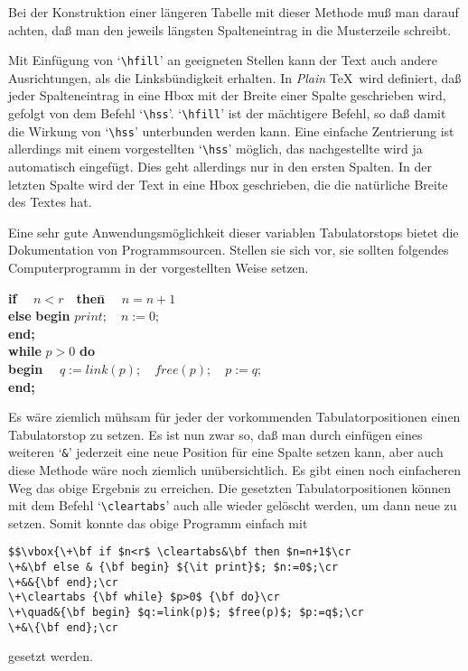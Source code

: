 Bei der Konstruktion einer l\"angeren Tabelle mit dieser Methode mu\ss{}
man darauf achten, da\ss{} man den jeweils l\"angsten Spalteneintrag in die
Musterzeile schreibt.

Mit 
Einf\"ugung von 
`\verb|\hfill|' an geeigneten Stellen kann der Text
auch andere Ausrichtungen, als die 
Linksb\"undigkeit erhalten. In {\em Plain}
\TeX\ wird definiert, da\ss{} jeder Spalteneintrag in eine 
Hbox mit der
Breite einer Spalte geschrieben wird, gefolgt von dem Befehl
`\verb|\hss|'. 
`\verb|\hfill|' ist der m\"achtigere Befehl, so da\ss{} damit
die Wirkung von `\verb|\hss|' unterbunden werden kann. Eine einfache
Zentrierung ist allerdings mit einem vorgestellten `\verb|\hss|'
m\"oglich, das nachgestellte wird ja automatisch eingef\"ugt. Dies geht
allerdings nur in den ersten Spalten. In der letzten Spalte wird der
Text in eine Hbox geschrieben, die die nat\"urliche Breite des Textes
hat.

Eine sehr gute Anwendungsm\"oglichkeit dieser variablen Tabulatorstops
bietet die Dokumentation von Programmsourcen. Stellen sie sich vor,
sie sollten folgendes Computerprogramm in der vorgestellten Weise
setzen.

\medskip\begin{tabbing}
\qquad\= {\bf if}\= $\quad n<r\quad$\= {\bf then}\= $\quad n=n+1$\\
\> \> \> {\bf else} \> {\bf begin} $print;\quad n:=0;$\\
\> \> \> \> {\bf end;}\\
\> {\bf while} $p>0$ {\bf do} \> \> \> \\
\> \> {\bf begin} $\quad q:=link(p);\quad free(p);\quad p:=q;$ \> \> \\
\> \> {\bf end;} \> \> \\
\end{tabbing}\medskip

Es w\"are ziemlich m\"uhsam f\"ur jeder der vorkommenden Tabulatorpositionen
einen Tabulatorstop zu setzen. Es ist nun zwar so, da\ss{} man durch
einf\"ugen eines weiteren `\verb|&|' jederzeit eine
neue Position f\"ur
eine Spalte setzen kann, aber auch diese Methode w\"are noch ziemlich
un\"ubersichtlich. Es gibt einen noch einfacheren Weg das obige Ergebnis
zu erreichen. Die gesetzten Tabulatorpositionen k\"onnen mit dem Befehl
`\verb|\cleartabs|' auch alle wieder gel\"oscht werden, um dann neue zu
setzen. Somit konnte das obige Programm einfach mit
\begin{verbatim}
$$\vbox{\+\bf if $n<r$ \cleartabs&\bf then $n=n+1$\cr
\+&\bf else & {\bf begin} ${\it print}$; $n:=0$;\cr
\+&&{\bf end};\cr
\+\cleartabs {\bf while} $p>0$ {\bf do}\cr
\+\quad&{\bf begin} $q:=link(p)$; $free(p)$; $p:=q$;\cr
\+&\{\bf end};\cr
\end{verbatim}
gesetzt werden.

